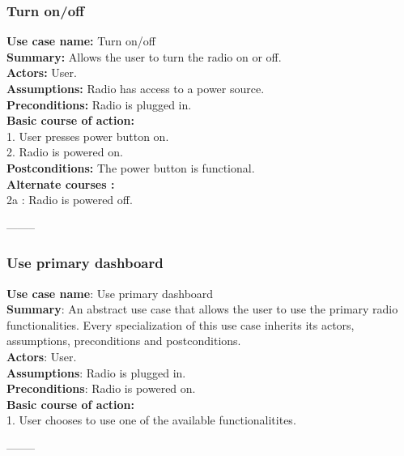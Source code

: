 \documentclass[11pt]{article}
\begin{document}
\subsubsection{Turn on/off}
\textbf{Use case name:} Turn on/off\\
\textbf{Summary:} Allows the user to turn the radio on or off.\\
\textbf{Actors:} User.\\
\textbf{Assumptions:} Radio has access to a power source.\\
\textbf{Preconditions:} Radio is plugged in.\\
\textbf{Basic course of action:}\\
1. User presses power button on.\\
2. Radio is powered on.\\
\textbf{Postconditions: }The power button is functional.\\
\textbf{Alternate courses :}\\
2a : Radio is powered off.
\begin{center}--------\end{center}

\subsubsection{Use primary dashboard}
\textbf{Use case name}: Use primary dashboard\\
\textbf{Summary}: An abstract use case that allows the user to use the primary radio functionalities. Every specialization of this use case inherits its actors, assumptions, preconditions and postconditions.\\
\textbf{Actors}: User.\\
\textbf{Assumptions}: Radio is plugged in.\\
\textbf{Preconditions}: Radio is powered on.\\
\textbf{Basic course of action:}\\
1. User chooses to use one of the available functionalitites.
\begin{center}--------\end{center}
\end{document}
